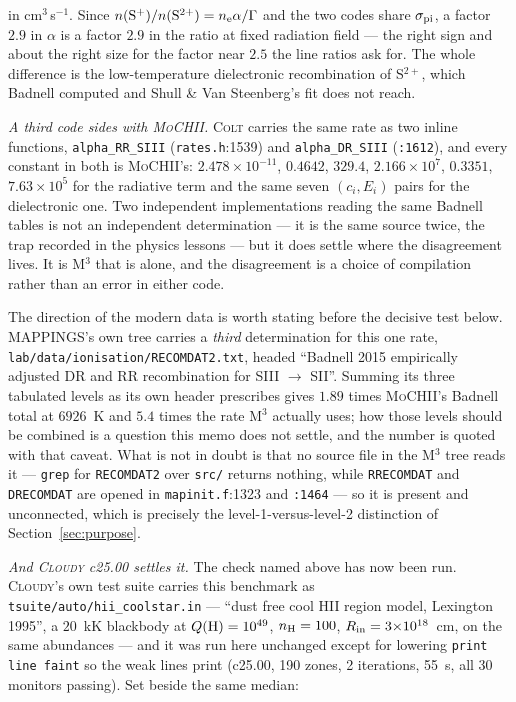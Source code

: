 \documentclass[english,a4paper]{my_memo}
\newcommand{\code}[1]{\texttt{#1}}
\newcommand{\MoCHII}{\textsc{MoCHII}}
\newcommand{\Mthree}{M$^3$}
\newcommand{\Cloudy}{\textsc{Cloudy}}
\newcommand{\Colt}{\textsc{Colt}}
\newcommand{\nelec}{n_{\rm e}}
\begin{document}
\noindent
in cm$^3$\,s$^{-1}$.  Since
$n({\rm S^+})/n({\rm S^{2+}}) = \nelec\alpha/\Gamma$ and the two codes
share $\sigma_{\rm pi}$, a factor $2.9$ in $\alpha$ is a factor $2.9$ in
the ratio at fixed radiation field --- the right sign and about the right
size for the factor near $2.5$ the line ratios ask for.  The whole
difference is the low-temperature dielectronic recombination of S$^{2+}$,
which Badnell computed and Shull \& Van Steenberg's fit does not reach.

\emph{A third code sides with \MoCHII{}.}  \Colt{} carries the same rate as
two inline functions, \code{alpha\_RR\_SIII} (\code{rates.h}:1539) and
\code{alpha\_DR\_SIII} (\code{:1612}), and every constant in both is
\MoCHII{}'s: $2.478{\times}10^{-11}$, $0.4642$, $329.4$, $2.166{\times}10^7$,
$0.3351$, $7.63{\times}10^5$ for the radiative term and the same seven
$(c_i, E_i)$ pairs for the dielectronic one.  Two independent
implementations reading the same Badnell tables is not an independent
determination --- it is the same source twice, the trap recorded in the
physics lessons --- but it does settle where the disagreement lives.  It is
\Mthree{} that is alone, and the disagreement is a choice of compilation
rather than an error in either code.

The direction of the modern data is worth stating before the decisive test
below.  MAPPINGS's own tree carries a \emph{third} determination for this
one rate, \code{lab/data/ionisation/RECOMDAT2.txt}, headed ``Badnell 2015
empirically adjusted DR and RR recombination for SIII $\to$ SII''.  Summing
its three tabulated levels as its own header prescribes gives $1.89$ times
\MoCHII{}'s Badnell total at $6926$~K and $5.4$ times the rate \Mthree{}
actually uses; how those levels should be combined is a question this memo
does not settle, and the number is quoted with that caveat.  What is not in
doubt is that no source file in the \Mthree{} tree reads it ---
\code{grep} for \code{RECOMDAT2} over \code{src/} returns nothing, while
\code{RRECOMDAT} and \code{DRECOMDAT} are opened in \code{mapinit.f}:1323
and \code{:1464} --- so it is present and unconnected, which is precisely
the level-1-versus-level-2 distinction of Section~\ref{sec:purpose}.

\emph{And \Cloudy{} c25.00 settles it.}  The check named above has now been
run.  \Cloudy{}'s own test suite carries this benchmark as
\code{tsuite/auto/hii\_coolstar.in} --- ``dust free cool HII region model,
Lexington 1995'', a $20$~kK blackbody at $Q({\rm H}) = 10^{49}$,
$n_{\rm H} = 100$, $R_{\rm in} = 3{\times}10^{18}$~cm, on the same
abundances --- and it was run here unchanged except for lowering
\code{print line faint} so the weak lines print (c25.00, 190 zones, 2
iterations, 55~s, all 30 monitors passing).  Set beside the same median:
\end{document}
